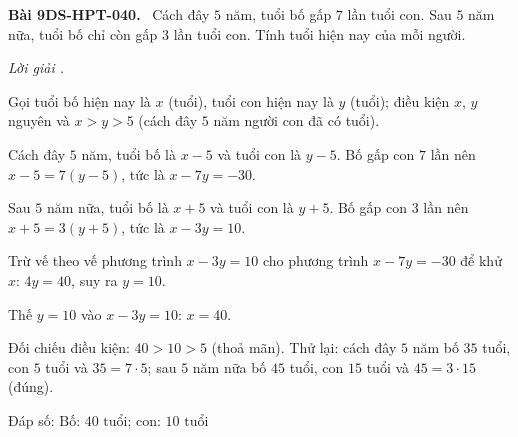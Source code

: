 \documentclass[12pt,a4paper]{article}
\newenvironment{problem}[1][]{\par\medskip\noindent\textbf{Bài #1.}\ }{\par}
\newenvironment{solution}[1][]{\par\noindent\textit{Lời giải #1.}\par}{\par}
\begin{document}
\begin{problem}[9DS-HPT-040]
Cách đây $5$ năm, tuổi bố gấp $7$ lần tuổi con. Sau $5$ năm nữa, tuổi bố chỉ còn gấp $3$ lần tuổi con. Tính tuổi hiện nay của mỗi người.

\begin{solution}
Gọi tuổi bố hiện nay là $x$ (tuổi), tuổi con hiện nay là $y$ (tuổi); điều kiện $x$, $y$ nguyên và $x > y > 5$ (cách đây $5$ năm người con đã có tuổi).

Cách đây $5$ năm, tuổi bố là $x - 5$ và tuổi con là $y - 5$. Bố gấp con $7$ lần nên $x - 5 = 7(y - 5)$, tức là $x - 7y = -30$.

Sau $5$ năm nữa, tuổi bố là $x + 5$ và tuổi con là $y + 5$. Bố gấp con $3$ lần nên $x + 5 = 3(y + 5)$, tức là $x - 3y = 10$.

Trừ vế theo vế phương trình $x - 3y = 10$ cho phương trình $x - 7y = -30$ để khử $x$: $4y = 40$, suy ra $y = 10$.

Thế $y = 10$ vào $x - 3y = 10$: $x = 40$.

Đối chiếu điều kiện: $40 > 10 > 5$ (thoả mãn). Thử lại: cách đây $5$ năm bố $35$ tuổi, con $5$ tuổi và $35 = 7 \cdot 5$; sau $5$ năm nữa bố $45$ tuổi, con $15$ tuổi và $45 = 3 \cdot 15$ (đúng).

Đáp số: $\boxed{\text{Bố: } 40 \text{ tuổi; con: } 10 \text{ tuổi}}$
\end{solution}
\end{problem}
\end{document}
